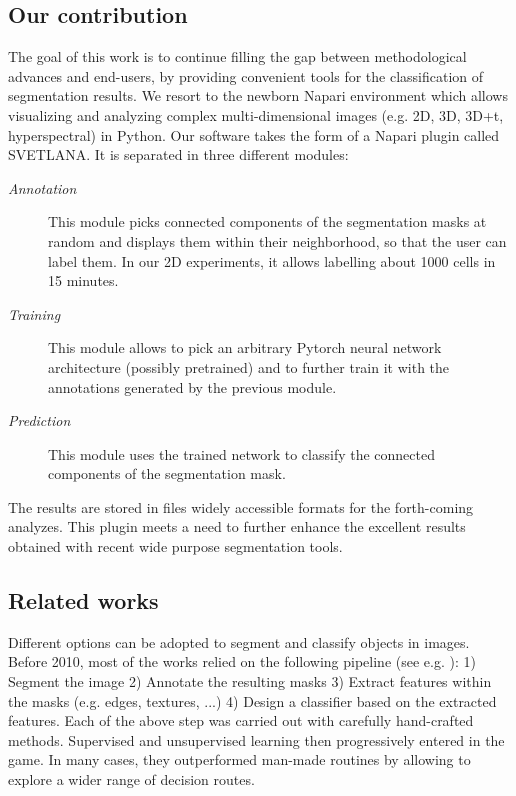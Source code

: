 \documentclass{article}
\begin{document}
\subsection{Our contribution}

The goal of this work is to continue filling the gap between methodological advances and end-users, by providing convenient tools for the classification of segmentation results. 
We resort to the newborn Napari environment \cite{perkel2021python} which allows visualizing and analyzing complex multi-dimensional images (e.g. 2D, 3D, 3D+t, hyperspectral) in Python.
Our software takes the form of a Napari plugin called SVETLANA. 
It is separated in three different modules: 
\begin{description}
  \item[\emph{Annotation}] This module picks connected components of the segmentation masks at random and displays them within their neighborhood, so that the user can label them. In our 2D experiments, it allows labelling about 1000 cells in 15 minutes.
  \item[\emph{Training}] This module allows to pick an arbitrary Pytorch \cite{paszke2019pytorch} neural network architecture (possibly pretrained) and to further train it with the annotations generated by the previous module.
  \item[\emph{Prediction}] This module uses the trained network to classify the connected components of the segmentation mask.
\end{description}
The results are stored in files widely accessible formats for the forth-coming analyzes. This plugin meets a need to further enhance the excellent results obtained with recent wide purpose segmentation tools.

\subsection{Related works}

Different options can be adopted to segment and classify objects in images. 
Before 2010, most of the works relied on the following pipeline (see e.g. \cite{irshad2013methods}): 1) Segment the image 2) Annotate the resulting masks 3) Extract features within the masks (e.g. edges, textures, ...) 4) Design a classifier based on the extracted features. 
Each of the above step was carried out with carefully hand-crafted methods. 
Supervised and unsupervised learning then progressively entered in the game. 
In many cases, they outperformed man-made routines by allowing to explore a wider range of decision routes. 
\end{document}
